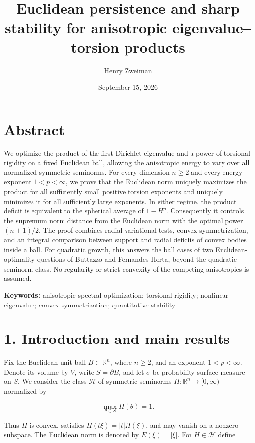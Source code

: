 \documentclass[11pt]{article}
\title{Euclidean persistence and sharp stability for anisotropic eigenvalue--torsion products}
\author{Henry Zweiman}
\date{September 15, 2026}
\begin{document}
\maketitle
\section{Abstract}\label{abstract}

We optimize the product of the first Dirichlet eigenvalue and a power of
torsional rigidity on a fixed Euclidean ball, allowing the anisotropic
energy to vary over all normalized symmetric seminorms. For every
dimension \(n\geq2\) and every energy exponent \(1<p<\infty\), we prove
that the Euclidean norm uniquely maximizes the product for all
sufficiently small positive torsion exponents and uniquely minimizes it
for all sufficiently large exponents. In either regime, the product
deficit is equivalent to the spherical average of \(1-H^p\).
Consequently it controls the supremum norm distance from the Euclidean
norm with the optimal power \((n+1)/2\). The proof combines radial
variational tests, convex symmetrization, and an integral comparison
between support and radial deficits of convex bodies inside a ball. For
quadratic growth, this answers the ball cases of two
Euclidean-optimality questions of Buttazzo and Fernandes Horta, beyond
the quadratic-seminorm class. No regularity or strict convexity of the
competing anisotropies is assumed.

\textbf{Keywords:} anisotropic spectral optimization; torsional
rigidity; nonlinear eigenvalue; convex symmetrization; quantitative
stability.

\section{1. Introduction and main
results}\label{introduction-and-main-results}

Fix the Euclidean unit ball \(B\subset\mathbb R^n\), where \(n\geq2\),
and an exponent \(1<p<\infty\). Denote its volume by \(V\), write
\(S=\partial B\), and let \(\sigma\) be probability surface measure on
\(S\). We consider the class \(\mathcal H\) of symmetric seminorms
\(H:\mathbb R^n\to[0,\infty)\) normalized by

\[
\max_{\theta\in S}H(\theta)=1.
\tag{1.1}
\]

Thus \(H\) is convex, satisfies \(H(t\xi)=|t|H(\xi)\), and may vanish on
a nonzero subspace. The Euclidean norm is denoted by \(E(\xi)=|\xi|\).
For \(H\in\mathcal H\) define
\end{document}
